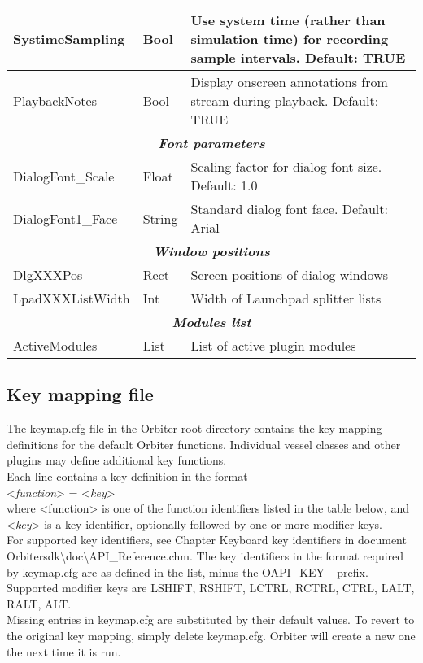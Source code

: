 \documentclass[Orbiter User Manual.tex]{subfiles}
\begin{document}
\begin{longtable}{ |p{}|p{}|p{}| }
	SystimeSampling & Bool & Use system time (rather than simulation time) for recording sample intervals. Default: TRUE\\
	\hline\rule{0pt}{2ex}
	PlaybackNotes & Bool & Display onscreen annotations from stream during playback. Default: TRUE\\
	\hline
	\multicolumn{3}{|c|}{\rule{0pt}{2ex}\textbf{\textit{Font parameters}}}\\
	\hline\rule{0pt}{2ex}
	DialogFont\_Scale & Float & Scaling factor for dialog font size. Default: 1.0\\
	\hline\rule{0pt}{2ex}
	DialogFont1\_Face & String & Standard dialog font face. Default: Arial\\
	\hline
	\multicolumn{3}{|c|}{\rule{0pt}{2ex}\textbf{\textit{Window positions}}}\\
	\hline\rule{0pt}{2ex}
	DlgXXXPos & Rect & Screen positions of dialog windows\\
	\hline\rule{0pt}{2ex}
	LpadXXXListWidth & Int & Width of Launchpad splitter lists\\
	\hline
	\multicolumn{3}{|c|}{\rule{0pt}{2ex}\textbf{\textit{Modules list}}}\\
	\hline\rule{0pt}{2ex}
	ActiveModules & List & List of active plugin modules\\
	\hline
	\end{longtable}


\subsection{Key mapping file}
The keymap.cfg file in the Orbiter root directory contains the key mapping definitions for the default Orbiter functions. Individual vessel classes and other plugins may define additional key functions.\\
Each line contains a key definition in the format\\
\indent <\textit{function}> = <\textit{key}>\\
where <function> is one of the function identifiers listed in the table below, and <\textit{key}> is a key identifier, optionally followed by one or more modifier keys.\\
For supported key identifiers, see Chapter Keyboard key identifiers in document Orbitersdk\textbackslash doc\textbackslash API\_Reference.chm. The key identifiers in the format required by keymap.cfg are as defined in the list, minus the OAPI\_KEY\_ prefix.\\
Supported modifier keys are LSHIFT, RSHIFT, LCTRL, RCTRL, CTRL, LALT, RALT, ALT.\\
Missing entries in keymap.cfg are substituted by their default values. To revert to the original key mapping, simply delete keymap.cfg. Orbiter will create a new one the next time it is run.
\end{document}
